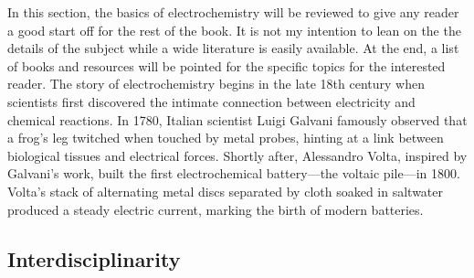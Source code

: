 In this section, the basics of electrochemistry will be reviewed to give any reader a good start off for the rest of the book. It is not my intention to lean on the the details of the subject while a wide literature is easily available. At the end, a list of books and resources will be pointed for the specific topics for the interested reader.
The story of electrochemistry begins in the late 18th century when scientists first discovered the intimate connection between electricity and chemical reactions. In 1780, Italian scientist Luigi Galvani famously observed that a frog’s leg twitched when touched by metal probes, hinting at a link between biological tissues and electrical forces. Shortly after, Alessandro Volta, inspired by Galvani’s work, built the first electrochemical battery—the voltaic pile—in 1800. Volta’s stack of alternating metal discs separated by cloth soaked in saltwater produced a steady electric current, marking the birth of modern batteries. 

\subsection{Interdisciplinarity}

